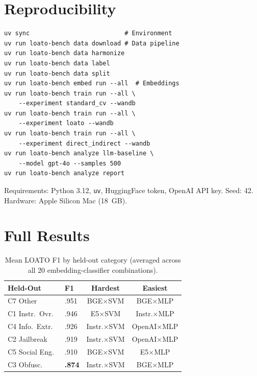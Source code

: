 \documentclass[conference]{IEEEtran}
\newcommand{\Fone}{F1}
\begin{document}



\appendix

\section{Reproducibility}
\label{app:repro}

{\small
\begin{verbatim}
uv sync                          # Environment
uv run loato-bench data download # Data pipeline
uv run loato-bench data harmonize
uv run loato-bench data label
uv run loato-bench data split
uv run loato-bench embed run --all  # Embeddings
uv run loato-bench train run --all \
    --experiment standard_cv --wandb
uv run loato-bench train run --all \
    --experiment loato --wandb
uv run loato-bench train run --all \
    --experiment direct_indirect --wandb
uv run loato-bench analyze llm-baseline \
    --model gpt-4o --samples 500
uv run loato-bench analyze report
\end{verbatim}
}

\noindent Requirements: Python 3.12, \texttt{uv}, HuggingFace token, OpenAI API
key. Seed: 42. Hardware: Apple Silicon Mac (18~GB).

\section{Full Results}
\label{app:full-results}

\begin{table}[h]
\centering
\footnotesize
\caption{Mean LOATO \Fone{} by held-out category (averaged across all 20
  embedding-classifier combinations).}
\label{tab:per-fold-summary}
\begin{tabular}{llcc}
\toprule
\textbf{Held-Out} & \textbf{\Fone{}} & \textbf{Hardest} & \textbf{Easiest} \\
\midrule
C7 Other & .951 & BGE$\times$SVM & BGE$\times$MLP \\
C1 Instr.\ Ovr.\ & .946 & E5$\times$SVM & Instr.$\times$MLP \\
C4 Info.\ Extr.\ & .926 & Instr.$\times$SVM & OpenAI$\times$MLP \\
C2 Jailbreak & .919 & Instr.$\times$SVM & OpenAI$\times$MLP \\
C5 Social Eng.\ & .910 & BGE$\times$SVM & E5$\times$MLP \\
C3 Obfusc.\ & \textbf{.874} & Instr.$\times$SVM & BGE$\times$MLP \\
\bottomrule
\end{tabular}
\end{table}
\end{document}
